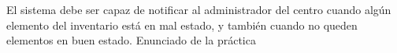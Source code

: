 {\reportauthors}
{El sistema debe ser capaz de notificar al administrador del centro cuando algún elemento del inventario está en mal estado, y también cuando no queden elementos en buen estado.}
{}
{Enunciado de la práctica}

